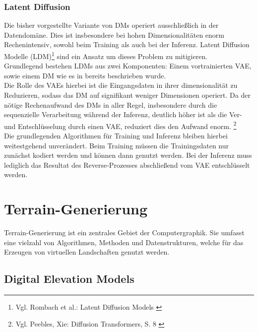 \subsubsection{Latent Diffusion}

Die bisher vorgestellte Variante von DMs operiert ausschließlich in der Datendomäne. Dies ist insbesondere bei hohen Dimensionalitäten enorm Rechenintensiv, sowohl beim Training als auch bei der Inferenz. Latent Diffusion Modelle (LDM)\footnote{
    Vgl. Rombach et al.: Latent Diffusion Models
    \cite{rombach2022high}
} sind ein Ansatz um dieses Problem zu mitigieren. \\
Grundlegend bestehen LDMs aus zwei Komponenten: Einem vortrainierten VAE, sowie einem DM wie es in bereits beschrieben wurde. \\
Die Rolle des VAEs hierbei ist die Eingangsdaten in ihrer dimensionalität zu Reduzieren, sodass das DM auf signifikant weniger Dimensionen operiert. Da der nötige Rechenaufwand des DMs in aller Regel, insbesondere durch die sequenzielle Verarbeitung während der Inferenz, deutlich höher ist als die Ver- und Entschlüsselung durch einen VAE, reduziert dies den Aufwand enorm. \footnote{
    Vgl. Peebles, Xie: Diffusion Transformers, S. 8
    \cite{peebles2023scalable}
} \\
Die grundlegenden Algorithmen für Training und Inferenz bleiben hierbei weitestgehend unverändert. Beim Training müssen die Trainingsdaten nur zunächst kodiert werden und können dann genutzt werden. Bei der Inferenz muss lediglich das Resultat des Reverse-Prozesses abschließend vom \ac{VAE} entschlüsselt werden.


\section{Terrain-Generierung}

Terrain-Generierung ist ein zentrales Gebiet der Computergraphik. Sie umfasst eine vielzahl von Algorithmen, Methoden und Datenstrukturen, welche für das Erzeugen von virtuellen Landschaften genutzt werden.

\subsection{Digital Elevation Models}

